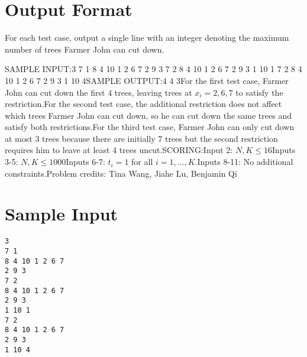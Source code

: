 \documentclass[12pt]{article}
\begin{document}
\section*{Output Format}
For each test case, output a single line with an integer denoting the maximum
number of trees Farmer John can cut down.

SAMPLE INPUT:3
7 1
8 4 10 1 2 6 7
2 9 3
7 2
8 4 10 1 2 6 7
2 9 3
1 10 1
7 2
8 4 10 1 2 6 7
2 9 3
1 10 4SAMPLE OUTPUT:4
4
3For the first test case, Farmer John can cut down the first $4$ trees, leaving
trees at $x_i = 2, 6, 7$ to satisfy the restriction.For the second test case, the additional restriction does not affect which trees
Farmer John can cut down, so he can cut down the same trees and satisfy both
restrictions.For the third test case, Farmer John can only cut down at most $3$ trees because
there are initially $7$ trees but the second restriction requires him to leave
at least $4$ trees uncut.SCORING:Input 2: $N, K \le 16$Inputs 3-5: $N, K \le 1000$Inputs 6-7: $t_i = 1$ for all $i = 1, \dots, K$.Inputs 8-11: No additional constraints.Problem credits: Tina Wang, Jiahe Lu, Benjamin Qi

\section*{Sample Input}
\begin{verbatim}
3
7 1
8 4 10 1 2 6 7
2 9 3
7 2
8 4 10 1 2 6 7
2 9 3
1 10 1
7 2
8 4 10 1 2 6 7
2 9 3
1 10 4
\end{verbatim}
\end{document}

